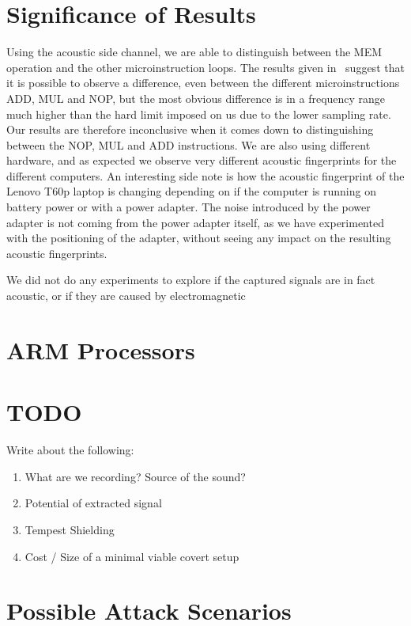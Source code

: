 \section{Significance of Results}
Using the acoustic side channel, we are able to distinguish between the MEM operation and the other microinstruction loops.
The results given in~\cite[Fig.~2]{DBLP:conf/crypto/GenkinST14} suggest that it is possible to observe a difference, even between the different microinstructions ADD, MUL and NOP, but the most obvious difference is in a frequency range much higher than the hard limit imposed on us due to the lower sampling rate.
Our results are therefore inconclusive when it comes down to distinguishing between the NOP, MUL and ADD instructions.
We are also using different hardware, and as expected we observe very different acoustic fingerprints for the different computers. 
An interesting side note is how the acoustic fingerprint of the Lenovo T60p laptop is changing depending on if the computer is running on battery power or with a power adapter.
The noise introduced by the power adapter is not coming from the power adapter itself, as we have experimented with the positioning of the adapter, without seeing any impact on the resulting acoustic fingerprints.

We did not do any experiments to explore if the captured signals are in fact acoustic, or if they are caused by electromagnetic 

\section{ARM Processors}

\section{TODO}
Write about the following:
\begin{enumerate}
	\item What are we recording? Source of the sound?
	\item Potential of extracted signal
	\item Tempest Shielding
	\item Cost / Size of a minimal viable covert setup
\end{enumerate}


\section{Possible Attack Scenarios}\label{chp6:sec:attack_scenarios}


